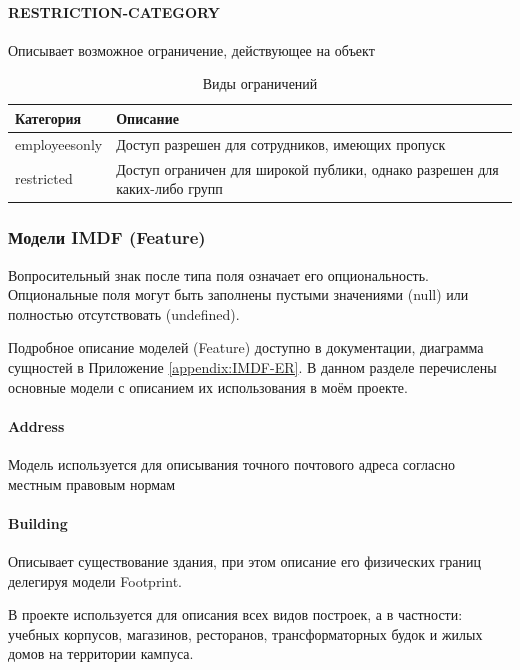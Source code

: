         \paragraph{RESTRICTION-CATEGORY}
          Описывает возможное ограничение, действующее на объект
          \begin{center}
            \begin{xltabular}{\linewidth}{|l|X|}
              \caption{Виды ограничений}\\\hline
              Категория     & Описание                                                                   \\\hline
              employeesonly & Доступ разрешен для сотрудников, имеющих пропуск                            \\\hline
              restricted    & Доступ ограничен для широкой публики, однако разрешен для каких-либо групп \\\hline
            \end{xltabular}
          \end{center}

      \subsubsection{Модели IMDF (Feature)}
        Вопросительный знак после типа поля означает его опциональность. Опциональные поля могут быть заполнены пустыми значениями (null) или полностью отсутствовать (undefined).

        Подробное описание моделей (Feature) доступно в документации\cite{IMDFFeatures}, диаграмма сущностей в Приложение \ref{appendix:IMDF-ER}. В данном разделе перечислены основные модели с описанием их использования в моём проекте.
        \paragraph{Address}
          Модель используется для описывания точного почтового адреса согласно местным правовым нормам

        \paragraph{Building}
          Описывает существование здания, при этом описание его физических границ делегируя модели Footprint.

          В проекте используется для описания всех видов построек, а в частности: учебных корпусов, магазинов, ресторанов, трансформаторных будок и жилых домов на территории кампуса.

